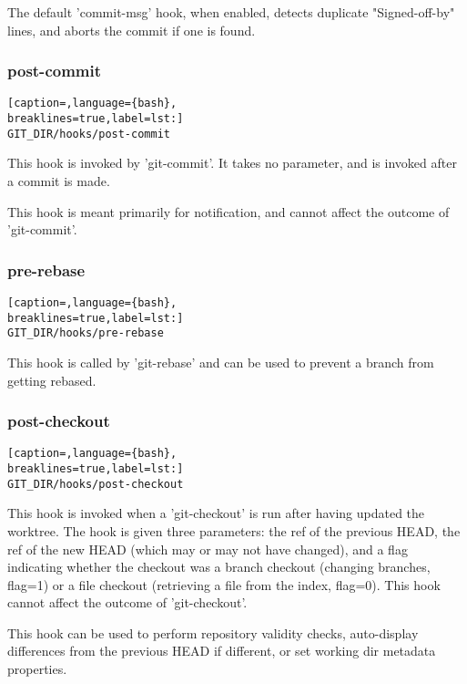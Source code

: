 The default 'commit-msg' hook, when enabled, detects duplicate "Signed-off-by"
lines, and aborts the commit if one is found.

\subsubsection{post-commit}
\lstset{basicstyle=\scriptsize, numbers=none, captionpos=b, tabsize=4}
\begin{lstlisting}[caption=,language={bash},
breaklines=true,label=lst:]
GIT_DIR/hooks/post-commit
\end{lstlisting}

This hook is invoked by 'git-commit'. It takes no parameter, and is invoked
after a commit is made.

This hook is meant primarily for notification, and cannot affect the outcome of
'git-commit'.

\subsubsection{pre-rebase}
\lstset{basicstyle=\scriptsize, numbers=none, captionpos=b, tabsize=4}
\begin{lstlisting}[caption=,language={bash},
breaklines=true,label=lst:]
GIT_DIR/hooks/pre-rebase
\end{lstlisting}

This hook is called by 'git-rebase' and can be used to prevent a branch from
getting rebased.

\subsubsection{post-checkout}
\lstset{basicstyle=\scriptsize, numbers=none, captionpos=b, tabsize=4}
\begin{lstlisting}[caption=,language={bash},
breaklines=true,label=lst:]
GIT_DIR/hooks/post-checkout
\end{lstlisting}

This hook is invoked when a 'git-checkout' is run after having updated the
worktree. The hook is given three parameters: the ref of the previous HEAD, the
ref of the new HEAD (which may or may not have changed), and a flag indicating
whether the checkout was a branch checkout (changing branches, flag=1) or a
file checkout (retrieving a file from the index, flag=0). This hook cannot
affect the outcome of 'git-checkout'.

This hook can be used to perform repository validity checks, auto-display
differences from the previous HEAD if different, or set working dir metadata
properties.

